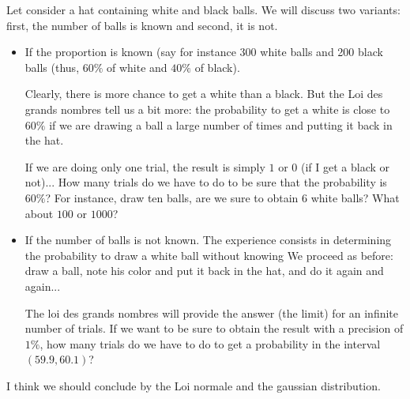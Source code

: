 \bigskip

Let consider a hat containing white and black balls.
We will discuss two variants: first, the number of balls is known and second, it is not.

\begin{itemize}
\item If the proportion is known (say for instance 300 white balls and 200 black balls
(thus, $60\%$ of white and $40\%$ of black).

Clearly, there is more chance to get a white than a black.
But the Loi des grands nombres tell us a bit more: the probability to get a white is close to $60\%$
if we are drawing a ball a large number of times and putting it back in the hat.

If we are doing only one trial, the result is simply $1$ or $0$ (if I get a black or not)...
How many trials do we have to do to be sure that the probability is $60\%$?
For instance, draw ten balls, are we sure to obtain $6$ white balls? What about $100$ or $1000$?
\item If the number of balls is not known.
The experience consists in determining the probability to draw a white ball without knowing 
We proceed as before:
draw a ball, note his color and put it back in the hat, and do it again and again...

The loi des grands nombres will provide the answer (the limit) for an infinite number of trials.
If we want to be sure to obtain the result with a precision of $1\%$,
how many trials do we have to do to get a probability in the interval $(59.9,60.1)$?
\end{itemize}

\medskip

\noindent {}
\bigskip

{\Denis I think we should conclude by the Loi normale and the gaussian distribution. }

